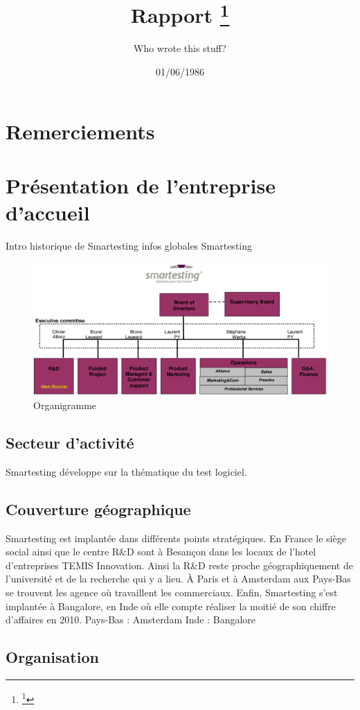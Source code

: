 \documentclass{article}
\title{Rapport
	\footnote{\thanks{A special form of footnote}}}
\author{Who wrote this stuff?}
\date{01/06/1986}
\begin{document}
\section{Remerciements}

\section{Présentation de l'entreprise d'accueil}
Intro historique de Smartesting infos globales
Smartesting 
\begin{figure}[!h]
\centering
\includegraphics[scale=0.50]{Illustrations/Organigramme_with_me.png}
\caption{Organigramme}
\label{fig:Organigramme de Smartesting}
\end{figure}

\subsection{Secteur d'activité}
Smartesting développe sur la thématique du test logiciel.

\subsection{Couverture géographique}
Smartesting est implantée dans différents points stratégiques. En France le siège social ainsi que le centre R\&D sont \`a Besançon dans les locaux de l'hotel d'entreprises TEMIS Innovation. Ainsi la R\&D reste proche géographiquement de l'université et de la recherche qui y a lieu.
\`A Paris et \`a Amsterdam aux Pays-Bas se trouvent les agence où travaillent les commerciaux.
Enfin, Smartesting s'est implantée à Bangalore, en Inde où elle compte réaliser la moitié de son chiffre d'affaires en 2010.
Pays-Bas : Amsterdam
Inde : Bangalore

\subsection{Organisation}
\end{document}
